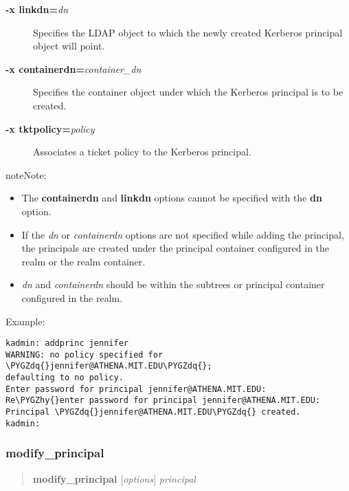 \documentclass[letterpaper,10pt,english]{sphinxmanual}
\def\PYGZhy{\char`\-}
\def\PYGZdq{\char`\"}
\begin{document}
\begin{description}
\begin{description}
\item[{\textbf{-x linkdn=}\emph{dn}}] \leavevmode
Specifies the LDAP object to which the newly created Kerberos
principal object will point.

\item[{\textbf{-x containerdn=}\emph{container\_dn}}] \leavevmode
Specifies the container object under which the Kerberos
principal is to be created.

\item[{\textbf{-x tktpolicy=}\emph{policy}}] \leavevmode
Associates a ticket policy to the Kerberos principal.

\end{description}

\begin{notice}{note}{Note:}\begin{itemize}
\item {} 
The \textbf{containerdn} and \textbf{linkdn} options cannot be
specified with the \textbf{dn} option.

\item {} 
If the \emph{dn} or \emph{containerdn} options are not specified while
adding the principal, the principals are created under the
principal container configured in the realm or the realm
container.

\item {} 
\emph{dn} and \emph{containerdn} should be within the subtrees or
principal container configured in the realm.

\end{itemize}
\end{notice}

\end{description}

Example:

\begin{Verbatim}[commandchars=\\\{\}]
kadmin: addprinc jennifer
WARNING: no policy specified for \PYGZdq{}jennifer@ATHENA.MIT.EDU\PYGZdq{};
defaulting to no policy.
Enter password for principal jennifer@ATHENA.MIT.EDU:
Re\PYGZhy{}enter password for principal jennifer@ATHENA.MIT.EDU:
Principal \PYGZdq{}jennifer@ATHENA.MIT.EDU\PYGZdq{} created.
kadmin:
\end{Verbatim}
\label{admin/admin_commands/kadmin_local:add-principal-end}

\subsubsection{modify\_principal}
\label{admin/admin_commands/kadmin_local:add-principal-end}\label{admin/admin_commands/kadmin_local:id2}\label{admin/admin_commands/kadmin_local:modify-principal}\begin{quote}

\textbf{modify\_principal} {[}\emph{options}{]} \emph{principal}
\end{quote}
\end{document}
